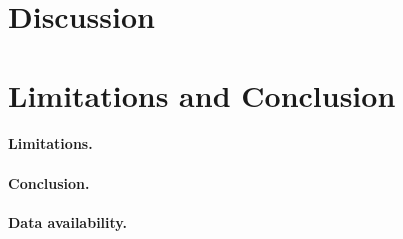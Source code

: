 \documentclass[11pt,letterpaper]{article}
\begin{document}
\section{Discussion}
  
\clearpage
\section{Limitations and Conclusion}
\paragraph{Limitations.}
  
\paragraph{Conclusion.}
  
\paragraph{Data availability.}
  

\clearpage




\clearpage
\appendix
\begingroup
\renewcommand{\thepage}{S\arabic{page}}
\setcounter{page}{1}
\fontsize{10}{12}\selectfont
\renewcommand{\thefigure}{S\arabic{figure}}
\renewcommand{\thetable}{S\arabic{table}}
\setcounter{figure}{0}
\setcounter{table}{0}


\clearpage
\endgroup
\end{document}
